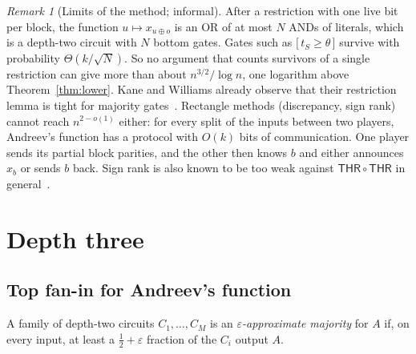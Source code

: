 \documentclass[11pt,letterpaper]{article}
\theoremstyle{remark}
\newtheorem*{remark}{Remark}
\newcommand{\ind}[1]{\bigl[\,#1\,\bigr]}
\newcommand{\sect}[1]{\section{\texorpdfstring{\color{ink}#1}{#1}}}
\newcommand{\subsect}[1]{\subsection*{\texorpdfstring{\color{ink}#1}{#1}}}
\newcommand{\THR}{\mathsf{THR}}
\begin{document}
\begin{remark}[Limits of the method; informal]
After a restriction with one live bit per block, the function
$u\mapsto x_{u\oplus o}$ is an OR of at most $N$ ANDs of literals, which is a
depth-two circuit with $N$ bottom gates. Gates such as $\ind{t_S\ge\theta}$
survive with probability $\Theta(k/\sqrt N)$. So no argument that counts
survivors of a single restriction can give more than about $n^{3/2}/\log n$,
one logarithm above Theorem~\ref{thm:lower}. Kane and Williams already observe
that their restriction lemma is tight for majority gates~\cite[Section~3]{KW}.
Rectangle methods (discrepancy, sign rank) cannot reach $n^{2-o(1)}$ either:
for every split of the inputs between two players, Andreev's function has a
protocol with $O(k)$ bits of communication. One player sends its partial
block parities, and the other then knows $b$ and either announces $x_b$ or
sends $b$ back. Sign rank is also known to be too weak against
$\THR\circ\THR$ in general~\cite{CM}.
\end{remark}

\sect{Depth three}\label{sec:depth3}

\subsect{Top fan-in for Andreev's function}

A family of depth-two circuits $C_1,\dots,C_M$ is an
\emph{$\varepsilon$-approximate majority} for $A$ if, on every input, at
least a $\tfrac12+\varepsilon$ fraction of the $C_i$ output $A$.
\end{document}
